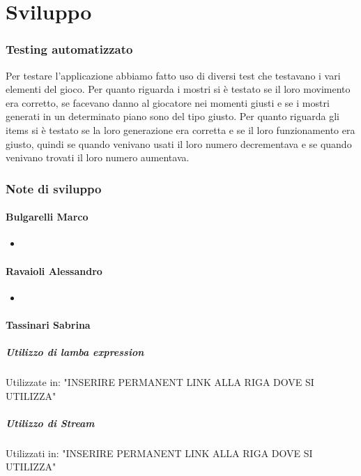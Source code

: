 \documentclass{report}
\begin{document}
\chapter{Sviluppo}

\subsection{Testing automatizzato}
Per testare l'applicazione abbiamo fatto uso di diversi test che testavano i vari elementi del gioco. 
%
Per quanto riguarda i mostri si è testato se il loro movimento era corretto, se facevano danno al giocatore nei momenti giusti e se i mostri generati in un determinato piano sono del tipo giusto.
%
Per quanto riguarda gli items si è testato se la loro generazione era corretta e se il loro funzionamento era giusto, quindi se quando venivano usati il loro numero decrementava e se quando venivano trovati il loro numero aumentava.
%

\subsection{Note di sviluppo}

\subsubsection{Bulgarelli Marco}
\begin{itemize}
    \item 
\end{itemize}

\subsubsection{Ravaioli Alessandro}
\begin{itemize}
    \item 
\end{itemize}

\subsubsection{Tassinari Sabrina}
\paragraph{Utilizzo di lamba expression}
Utilizzate in: "INSERIRE PERMANENT LINK ALLA RIGA DOVE SI UTILIZZA"

\paragraph{Utilizzo di Stream}
Utilizzati in: "INSERIRE PERMANENT LINK ALLA RIGA DOVE SI UTILIZZA"
\end{document}
